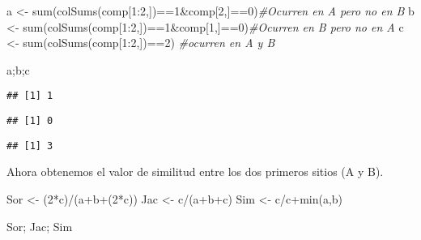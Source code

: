 \documentclass[
]{article}
\newenvironment{Shaded}{\begin{snugshade}}{\end{snugshade}}
\newcommand{\CommentTok}[1]{\textcolor[rgb]{0.56,0.35,0.01}{\textit{#1}}}
\newcommand{\DecValTok}[1]{\textcolor[rgb]{0.00,0.00,0.81}{#1}}
\newcommand{\FunctionTok}[1]{\textcolor[rgb]{0.00,0.00,0.00}{#1}}
\newcommand{\NormalTok}[1]{#1}
\newcommand{\OtherTok}[1]{\textcolor[rgb]{0.56,0.35,0.01}{#1}}
\newcommand{\SpecialCharTok}[1]{\textcolor[rgb]{0.00,0.00,0.00}{#1}}
\begin{document}
\begin{Shaded}
\begin{Highlighting}[]
\NormalTok{a }\OtherTok{\textless{}{-}} \FunctionTok{sum}\NormalTok{(}\FunctionTok{colSums}\NormalTok{(comp[}\DecValTok{1}\SpecialCharTok{:}\DecValTok{2}\NormalTok{,])}\SpecialCharTok{==}\DecValTok{1}\SpecialCharTok{\&}\NormalTok{comp[}\DecValTok{2}\NormalTok{,]}\SpecialCharTok{==}\DecValTok{0}\NormalTok{)}\CommentTok{\#Ocurren en A pero no en B}
\NormalTok{b }\OtherTok{\textless{}{-}} \FunctionTok{sum}\NormalTok{(}\FunctionTok{colSums}\NormalTok{(comp[}\DecValTok{1}\SpecialCharTok{:}\DecValTok{2}\NormalTok{,])}\SpecialCharTok{==}\DecValTok{1}\SpecialCharTok{\&}\NormalTok{comp[}\DecValTok{1}\NormalTok{,]}\SpecialCharTok{==}\DecValTok{0}\NormalTok{)}\CommentTok{\#Ocurren en B pero no en A}
\NormalTok{c }\OtherTok{\textless{}{-}} \FunctionTok{sum}\NormalTok{(}\FunctionTok{colSums}\NormalTok{(comp[}\DecValTok{1}\SpecialCharTok{:}\DecValTok{2}\NormalTok{,])}\SpecialCharTok{==}\DecValTok{2}\NormalTok{) }\CommentTok{\#ocurren en A y B}

\NormalTok{a;b;c}
\end{Highlighting}
\end{Shaded}

\begin{verbatim}
## [1] 1
\end{verbatim}

\begin{verbatim}
## [1] 0
\end{verbatim}

\begin{verbatim}
## [1] 3
\end{verbatim}

Ahora obtenemos el valor de similitud entre los dos primeros sitios (A y B).

\begin{Shaded}
\begin{Highlighting}[]
\NormalTok{Sor }\OtherTok{\textless{}{-}}\NormalTok{ (}\DecValTok{2}\SpecialCharTok{*}\NormalTok{c)}\SpecialCharTok{/}\NormalTok{(a}\SpecialCharTok{+}\NormalTok{b}\SpecialCharTok{+}\NormalTok{(}\DecValTok{2}\SpecialCharTok{*}\NormalTok{c))}
\NormalTok{Jac }\OtherTok{\textless{}{-}}\NormalTok{ c}\SpecialCharTok{/}\NormalTok{(a}\SpecialCharTok{+}\NormalTok{b}\SpecialCharTok{+}\NormalTok{c)}
\NormalTok{Sim }\OtherTok{\textless{}{-}}\NormalTok{ c}\SpecialCharTok{/}\NormalTok{c}\SpecialCharTok{+}\FunctionTok{min}\NormalTok{(a,b)}

\NormalTok{Sor; Jac; Sim}
\end{Highlighting}
\end{Shaded}
\end{document}
